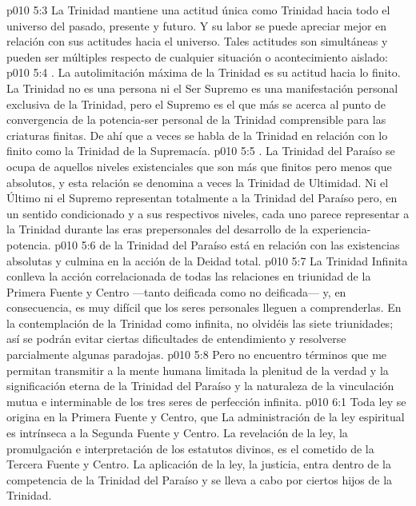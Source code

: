 \vs p010 5:3 \pc La Trinidad mantiene una actitud única como Trinidad hacia todo el universo del pasado, presente y futuro. Y su labor se puede apreciar mejor en relación con sus actitudes hacia el universo. Tales actitudes son simultáneas y pueden ser múltiples respecto de cualquier situación o acontecimiento aislado:
\vs p010 5:4 . La autolimitación máxima de la Trinidad es su actitud hacia lo finito. La Trinidad no es una persona ni el Ser Supremo es una manifestación personal exclusiva de la Trinidad, pero el Supremo es el que más se acerca al punto de convergencia de la potencia\hyp{}ser personal de la Trinidad comprensible para las criaturas finitas. De ahí que a veces se habla de la Trinidad en relación con lo finito como la Trinidad de la Supremacía.
\vs p010 5:5 . La Trinidad del Paraíso se ocupa de aquellos niveles existenciales que son más que finitos pero menos que absolutos, y esta relación se denomina a veces la Trinidad de Ultimidad. Ni el Último ni el Supremo representan totalmente a la Trinidad del Paraíso pero, en un sentido condicionado y a sus respectivos niveles, cada uno parece representar a la Trinidad durante las eras prepersonales del desarrollo de la experiencia\hyp{}potencia.
\vs p010 5:6  de la Trinidad del Paraíso está en relación con las existencias absolutas y culmina en la acción de la Deidad total.
\vs p010 5:7 \pc La Trinidad Infinita conlleva la acción correlacionada de todas las relaciones en triunidad de la Primera Fuente y Centro ---tanto deificada como no deificada--- y, en consecuencia, es muy difícil que los seres personales lleguen a comprenderlas. En la contemplación de la Trinidad como infinita, no olvidéis las siete triunidades; así se podrán evitar ciertas dificultades de entendimiento y resolverse parcialmente algunas paradojas.
\vs p010 5:8 \pc Pero no encuentro términos que me permitan transmitir a la mente humana limitada la plenitud de la verdad y la significación eterna de la Trinidad del Paraíso y la naturaleza de la vinculación mutua e interminable de los tres seres de perfección infinita.
\vs p010 6:1 Toda ley se origina en la Primera Fuente y Centro, que  La administración de la ley espiritual es intrínseca a la Segunda Fuente y Centro. La revelación de la ley, la promulgación e interpretación de los estatutos divinos, es el cometido de la Tercera Fuente y Centro. La aplicación de la ley, la justicia, entra dentro de la competencia de la Trinidad del Paraíso y se lleva a cabo por ciertos hijos de la Trinidad.
